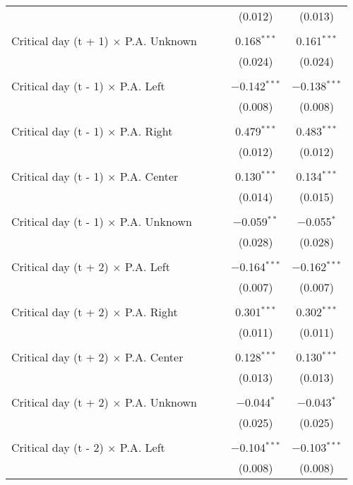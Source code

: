 \documentclass[
]{article}
\begin{document}
\begin{table}[!htbp]
{\begin{tabular}{@{\extracolsep{5pt}}lcccc}
  &  &  & (0.012) & (0.013) \\ 
  & & & & \\ 
 Critical day (t + 1) $\times$ P.A. Unknown &  &  & 0.168$^{***}$ & 0.161$^{***}$ \\ 
  &  &  & (0.024) & (0.024) \\ 
  & & & & \\ 
 Critical day (t - 1) $\times$ P.A. Left &  &  & $-$0.142$^{***}$ & $-$0.138$^{***}$ \\ 
  &  &  & (0.008) & (0.008) \\ 
  & & & & \\ 
 Critical day (t - 1) $\times$ P.A. Right &  &  & 0.479$^{***}$ & 0.483$^{***}$ \\ 
  &  &  & (0.012) & (0.012) \\ 
  & & & & \\ 
 Critical day (t - 1) $\times$ P.A. Center &  &  & 0.130$^{***}$ & 0.134$^{***}$ \\ 
  &  &  & (0.014) & (0.015) \\ 
  & & & & \\ 
 Critical day (t - 1) $\times$ P.A. Unknown &  &  & $-$0.059$^{**}$ & $-$0.055$^{*}$ \\ 
  &  &  & (0.028) & (0.028) \\ 
  & & & & \\ 
 Critical day (t + 2) $\times$ P.A. Left &  &  & $-$0.164$^{***}$ & $-$0.162$^{***}$ \\ 
  &  &  & (0.007) & (0.007) \\ 
  & & & & \\ 
 Critical day (t + 2) $\times$ P.A. Right &  &  & 0.301$^{***}$ & 0.302$^{***}$ \\ 
  &  &  & (0.011) & (0.011) \\ 
  & & & & \\ 
 Critical day (t + 2) $\times$ P.A. Center &  &  & 0.128$^{***}$ & 0.130$^{***}$ \\ 
  &  &  & (0.013) & (0.013) \\ 
  & & & & \\ 
 Critical day (t + 2) $\times$ P.A. Unknown &  &  & $-$0.044$^{*}$ & $-$0.043$^{*}$ \\ 
  &  &  & (0.025) & (0.025) \\ 
  & & & & \\ 
 Critical day (t - 2) $\times$ P.A. Left &  &  & $-$0.104$^{***}$ & $-$0.103$^{***}$ \\ 
  &  &  & (0.008) & (0.008) \\ 

\end{tabular}}
\end{table}
\end{document}

